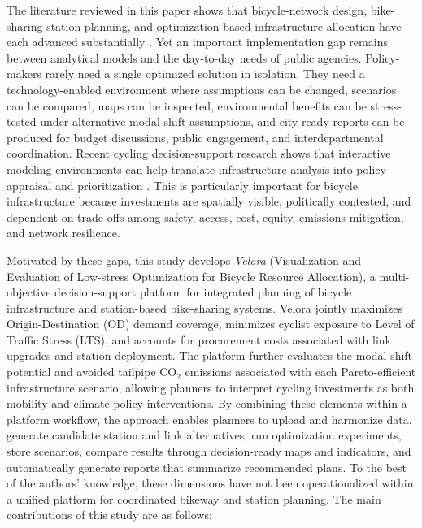 \documentclass[preprint,authoryear,10pt]{elsarticle}
\begin{document}
The literature reviewed in this paper shows that bicycle-network design, bike-sharing station planning, and optimization-based infrastructure allocation have each advanced substantially \citep{steinackerDemandDriven2022, shui2020reviewbicyclesharingservice}. Yet an important implementation gap remains between analytical models and the day-to-day needs of public agencies. Policy-makers rarely need a single optimized solution in isolation. They need a technology-enabled environment where assumptions can be changed, scenarios can be compared, maps can be inspected, environmental benefits can be stress-tested under alternative modal-shift assumptions, and city-ready reports can be produced for budget discussions, public engagement, and interdepartmental coordination. Recent cycling decision-support research shows that interactive modeling environments can help translate infrastructure analysis into policy appraisal and prioritization \citep{silvestriCyclabilityDSS2024}. This is particularly important for bicycle infrastructure because investments are spatially visible, politically contested, and dependent on trade-offs among safety, access, cost, equity, emissions mitigation, and network resilience.

Motivated by these gaps, this study develops \textit{Velora} (Visualization and Evaluation of Low-stress Optimization for Bicycle Resource Allocation), a multi-objective decision-support platform for integrated planning of bicycle infrastructure and station-based bike-sharing systems. Velora jointly maximizes Origin-Destination (OD) demand coverage, minimizes cyclist exposure to Level of Traffic Stress (LTS), and accounts for procurement costs associated with link upgrades and station deployment. The platform further evaluates the modal-shift potential and avoided tailpipe CO$_2$ emissions associated with each Pareto-efficient infrastructure scenario, allowing planners to interpret cycling investments as both mobility and climate-policy interventions. By combining these elements within a platform workflow, the approach enables planners to upload and harmonize data, generate candidate station and link alternatives, run optimization experiments, store scenarios, compare results through decision-ready maps and indicators, and automatically generate reports that summarize recommended plans. To the best of the authors' knowledge, these dimensions have not been operationalized within a unified platform for coordinated bikeway and station planning. The main contributions of this study are as follows:
\end{document}
